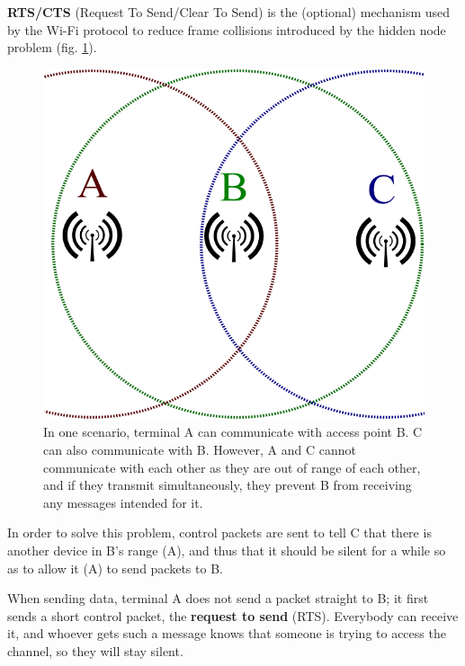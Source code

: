 \vspace{0.5em}

\textbf{RTS/CTS} (Request To Send/Clear To Send) is the (optional) mechanism used by the Wi-Fi protocol to reduce frame collisions introduced by the hidden node problem (fig. \ref{fig:wifi_hidden_node}).

\begin{figure}[h]
    \centering
    \includegraphics[scale=0.3]{img/wifi_hidden_node.png}
    \decoRule
    \caption{In one scenario, terminal A can communicate with access point B. C can also communicate with B. However, A and C cannot communicate with each other as they are out of range of each other, and if they transmit simultaneously, they prevent B from receiving any messages intended for it.}
    \label{fig:wifi_hidden_node}
\end{figure}

In order to solve this problem, control packets are sent to tell C that there is another device in B's range (A), and thus that it should be silent for a while so as to allow it (A) to send packets to B.

When sending data, terminal A does not send a packet straight to B; it first sends a short control packet, the \textbf{request to send} (RTS). Everybody can receive it, and whoever gets such a message knows that someone is trying to access the channel, so they will stay silent.

